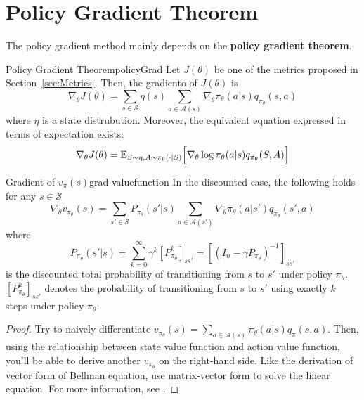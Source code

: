 \section{Policy Gradient Theorem}
    The policy gradient method mainly depends on the \textbf{policy gradient theorem}.
    \begin{thm}{Policy Gradient Theorem}{policyGrad}
        Let $J(\theta)$ be one of the metrics proposed in Section~\ref{sec:Metrics}. Then, the gradiento of $J(\theta)$ is
        \begin{equation}
            \nabla_\theta J(\theta) = \sum_{s\in\mathcal{S}}\eta(s)\sum_{a\in\mathcal{A}(s)}\nabla_\theta \pi_\theta(a|s)q_{\pi_\theta}(s,a)
        \end{equation}
        where $\eta$ is a state distrubution. Moreover, the equivalent equation expressed in terms of expectation exists:
        \begin{equation}
            \nabla_\theta J(\theta) = \mathbb{E}_{S \sim \eta, A \sim \pi_\theta(\cdot|S)} \Big[ \nabla_\theta \log{\pi_\theta(a|s)}q_{\pi_\theta}(S,A) \Big]
        \end{equation}
    \end{thm}

    \begin{lem}{Gradient of $v_\pi(s)$}{grad-valuefunction}
        In the discounted case, the following holds for any $s \in \mathcal{S}$
        \begin{equation}
            \nabla_\theta v_{\pi_\theta}(s) = \sum_{s' \in \mathcal{S}}P_{\pi_\theta}(s'|s) \sum_{a \in \mathcal{A}(s')}\nabla_\theta \pi_\theta(a|s')q_{\pi_\theta}(s',a)
        \end{equation}
        where
        \begin{equation}
            P_{\pi_\theta}(s'|s) = \sum_{k=0}^\infty \gamma^k [P_{\pi_\theta}^k]_{ss'} = [(I_n - \gamma P_{\pi_\theta})^{-1}]_{ss'}
        \end{equation}
        is the discounted total probability of transitioning from $s$ to $s'$ under policy $\pi_\theta$. $[P_{\pi_\theta}^k]_{ss'}$ denotes the probability of transitioning from
        $s$ to $s'$ using exactly $k$ steps under policy $\pi_\theta$.
    \end{lem}
    \begin{proof}
        Try to naively differentiate $v_{\pi_\theta}(s) = \sum_{a \in \mathcal{A}(s)}\pi_\theta(a|s)q_\pi(s,a)$. Then, using the relationship between state value function and action value function,
        you'll be able to derive another $v_{\pi_\theta}$ on the right-hand side. Like the derivation of vector form of Bellman equation, use matrix-vector form to solve the linear equation. For more information, see \cite{Zhao2025}.
    \end{proof}

    


